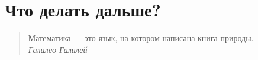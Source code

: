 \documentclass[fullscreen=true, bookmarks=false]{beamer} %
\begin{document}

\section{Что делать дальше?}


\begin{frame}
\begin{quote}
Математика — это язык, на котором написана книга природы.\\
{\em Галилео Галилей}
\end{quote}

\end{frame}

\end{document}
